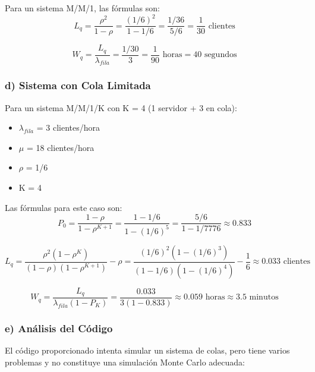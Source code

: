 \documentclass[12pt]{article}
\begin{document}
Para un sistema M/M/1, las fórmulas son:
\[
L_q = \frac{\rho^2}{1-\rho} = \frac{(1/6)^2}{1-1/6} = \frac{1/36}{5/6} = \frac{1}{30} \text{ clientes}
\]

\[
W_q = \frac{L_q}{\lambda_{fila}} = \frac{1/30}{3} = \frac{1}{90} \text{ horas} = 40 \text{ segundos}
\]

\subsubsection{d) Sistema con Cola Limitada}

Para un sistema M/M/1/K con K = 4 (1 servidor + 3 en cola):
\begin{itemize}
    \item $\lambda_{fila}$ = 3 clientes/hora
    \item $\mu$ = 18 clientes/hora
    \item $\rho$ = 1/6
    \item K = 4
\end{itemize}

Las fórmulas para este caso son:
\[
P_0 = \frac{1-\rho}{1-\rho^{K+1}} = \frac{1-1/6}{1-(1/6)^5} = \frac{5/6}{1-1/7776} \approx 0.833
\]

\[
L_q = \frac{\rho^2(1-\rho^K)}{(1-\rho)(1-\rho^{K+1})} - \rho = \frac{(1/6)^2(1-(1/6)^3)}{(1-1/6)(1-(1/6)^4)} - \frac{1}{6} \approx 0.033 \text{ clientes}
\]

\[
W_q = \frac{L_q}{\lambda_{fila}(1-P_K)} = \frac{0.033}{3(1-0.833)} \approx 0.059 \text{ horas} \approx 3.5 \text{ minutos}
\]

\subsubsection{e) Análisis del Código}

El código proporcionado intenta simular un sistema de colas, pero tiene varios problemas y no constituye una simulación Monte Carlo adecuada:
\end{document}
